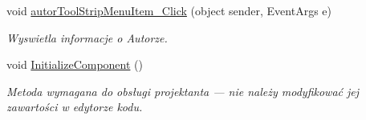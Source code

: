\begin{DoxyCompactItemize}
\mbox{\label{classkalku__all__in__one_1_1_form1_a15b1f2515415730a606a5a66dfe1ff00}} 
void \mbox{\hyperlink{classkalku__all__in__one_1_1_form1_a15b1f2515415730a606a5a66dfe1ff00}{autor\+Tool\+Strip\+Menu\+Item\+\_\+\+Click}} (object sender, Event\+Args e)
\begin{DoxyCompactList}\small\item\em Wyswietla informacje o Autorze. \end{DoxyCompactList}\item 
void \mbox{\hyperlink{classkalku__all__in__one_1_1_form1_acfb7737bb18b9292d406dc92c735c492}{Initialize\+Component}} ()
\begin{DoxyCompactList}\small\item\em Metoda wymagana do obsługi projektanta — nie należy modyfikować jej zawartości w edytorze kodu. \end{DoxyCompactList}\end{DoxyCompactItemize}
